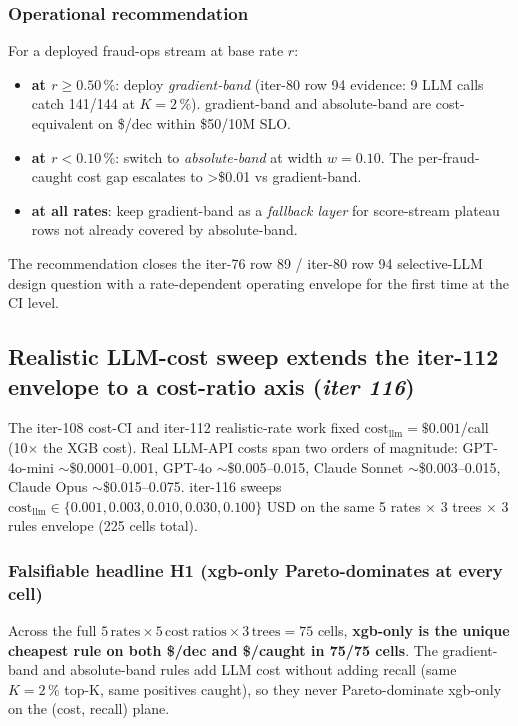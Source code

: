 \documentclass{article}
\begin{document}
\subsubsection{Operational recommendation}
For a deployed fraud-ops stream at base rate $r$:
\begin{itemize}
  \item \textbf{at $r \geq 0.50\,\%$}: deploy \textit{gradient-band}
        (iter-80 row 94 evidence: 9 LLM calls catch 141/144 at
        $K{=}2\,\%$). gradient-band and absolute-band are
        cost-equivalent on \$/dec within \$50/10M SLO.
  \item \textbf{at $r < 0.10\,\%$}: switch to
        \textit{absolute-band} at width $w{=}0.10$. The
        per-fraud-caught cost gap escalates to >\$0.01 vs
        gradient-band.
  \item \textbf{at all rates}: keep gradient-band as a
        \emph{fallback layer} for score-stream plateau rows not
        already covered by absolute-band.
\end{itemize}
The recommendation closes the iter-76 row 89 / iter-80 row 94
selective-LLM design question with a rate-dependent operating
envelope for the first time at the CI level.
 \subsection{Realistic LLM-cost sweep extends the iter-112 envelope to a
  cost-ratio axis (\textit{iter 116})}
\label{sec:p8-llm-cost-sweep}

The iter-108 cost-CI and iter-112 realistic-rate work fixed
$\mathrm{cost}_{\mathrm{llm}}{=}\$0.001$/call (10$\times$ the XGB
cost).  Real LLM-API costs span two orders of magnitude:
GPT-4o-mini $\sim$\$0.0001--0.001, GPT-4o $\sim$\$0.005--0.015,
Claude Sonnet $\sim$\$0.003--0.015, Claude Opus
$\sim$\$0.015--0.075. iter-116 sweeps
$\mathrm{cost}_{\mathrm{llm}}\in\{0.001, 0.003, 0.010, 0.030, 0.100\}$
USD on the same 5 rates $\times$ 3 trees $\times$ 3 rules
envelope (225 cells total).

\subsubsection{Falsifiable headline H1 (xgb-only Pareto-dominates at every cell)}
Across the full $5\,\mathrm{rates}\times 5\,\mathrm{cost\ ratios}\times
3\,\mathrm{trees}=75$ cells, \textbf{xgb-only is the unique cheapest
rule on both \$/dec and \$/caught in 75/75 cells}. The gradient-band
and absolute-band rules add LLM cost without adding recall (same
$K{=}2\,\%$ top-K, same positives caught), so they never Pareto-dominate
xgb-only on the (cost, recall) plane.
\end{document}
